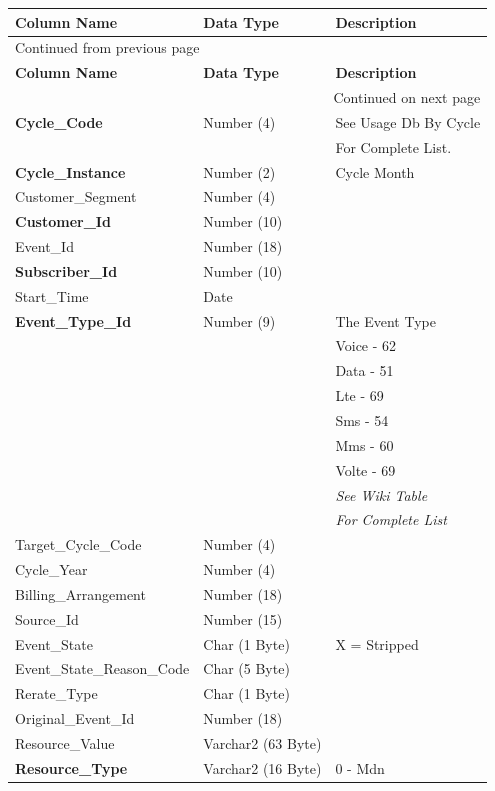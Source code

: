 \documentclass[12pt,twoside]{article}
\begin{document}
\begin{longtable}{l|l|l}
\hline
\textbf{Column Name} & \textbf{Data Type} & \textbf{Description}\\
\hline
\endfirsthead
\multicolumn{3}{l}{Continued from previous page} \\
\hline

\textbf{Column Name} & \textbf{Data Type} & \textbf{Description} \\

\hline
\endhead
\hline\multicolumn{3}{r}{Continued on next page} \\
\endfoot
\endlastfoot
\hline
\textbf{Cycle\_Code} & Number (4) & See Usage Db By Cycle\\
 &  & For Complete List.\\
\textbf{Cycle\_Instance} & Number (2) & Cycle Month\\
Customer\_Segment & Number (4) & \\
\textbf{Customer\_Id} & Number (10) & \\
Event\_Id & Number (18) & \\
\textbf{Subscriber\_Id} & Number (10) & \\
Start\_Time & Date & \\
\textbf{Event\_Type\_Id} & Number (9) & The Event Type\\
 &  & Voice - 62\\
 &  & Data - 51\\
 &  & Lte - 69\\
 &  & Sms - 54\\
 &  & Mms - 60\\
 &  & Volte - 69\\
 &  & \emph{See Wiki Table}\\
 &  & \emph{For Complete List}\\
Target\_Cycle\_Code & Number (4) & \\
Cycle\_Year & Number (4) & \\
Billing\_Arrangement & Number (18) & \\
Source\_Id & Number (15) & \\
Event\_State & Char (1 Byte) & X = Stripped\\
Event\_State\_Reason\_Code & Char (5 Byte) & \\
Rerate\_Type & Char (1 Byte) & \\
Original\_Event\_Id & Number (18) & \\
Resource\_Value & Varchar2 (63 Byte) & \\
\textbf{Resource\_Type} & Varchar2 (16 Byte) & 0 - Mdn\\

\end{longtable}
\end{document}
